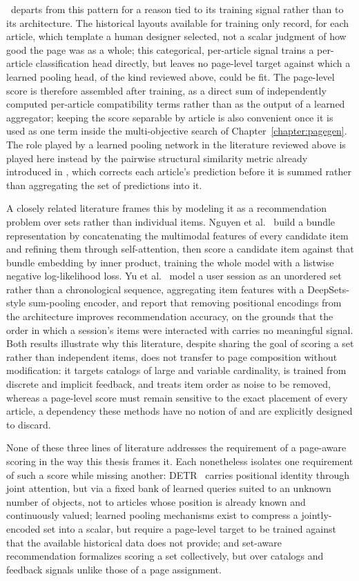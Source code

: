 \neuralmethod\ departs from this pattern for a reason tied to its training signal rather than to its architecture. The historical layouts available for training only record, for each article, which template a human designer selected, not a scalar judgment of how good the page was as a whole; this categorical, per-article signal trains a per-article classification head directly, but leaves no page-level target against which a learned pooling head, of the kind reviewed above, could be fit. The page-level score is therefore assembled after training, as a direct sum of independently computed per-article compatibility terms rather than as the output of a learned aggregator; keeping the score separable by article is also convenient once it is used as one term inside the multi-objective search of Chapter~\ref{chapter:pagegen}. The role played by a learned pooling network in the literature reviewed above is played here instead by the pairwise structural similarity metric already introduced in , which corrects each article's prediction before it is summed rather than aggregating the set of predictions into it.

A closely related literature frames this by modeling it as a recommendation problem over sets rather than individual items. Nguyen et al.~\cite{nguyen-ramen-2025} build a bundle representation by concatenating the multimodal features of every candidate item and refining them through self-attention, then score a candidate item against that bundle embedding by inner product, training the whole model with a listwise negative log-likelihood loss. Yu et al.~\cite{yu-dsetrec-2025} model a user session as an unordered set rather than a chronological sequence, aggregating item features with a DeepSets-style sum-pooling encoder, and report that removing positional encodings from the architecture improves recommendation accuracy, on the grounds that the order in which a session's items were interacted with carries no meaningful signal. Both results illustrate why this literature, despite sharing the goal of scoring a set rather than independent items, does not transfer to page composition without modification: it targets catalogs of large and variable cardinality, is trained from discrete and implicit feedback, and treats item order as noise to be removed, whereas a page-level score must remain sensitive to the exact placement of every article, a dependency these methods have no notion of and are explicitly designed to discard.

None of these three lines of literature addresses the requirement of a page-aware scoring in the way this thesis frames it. Each nonetheless isolates one requirement of such a score while missing another: DETR~\cite{carion-detr-2020} carries positional identity through joint attention, but via a fixed bank of learned queries suited to an unknown number of objects, not to articles whose position is already known and continuously valued; learned pooling mechanisms exist to compress a jointly-encoded set into a scalar, but require a page-level target to be trained against that the available historical data does not provide; and set-aware recommendation formalizes scoring a set collectively, but over catalogs and feedback signals unlike those of a page assignment.

